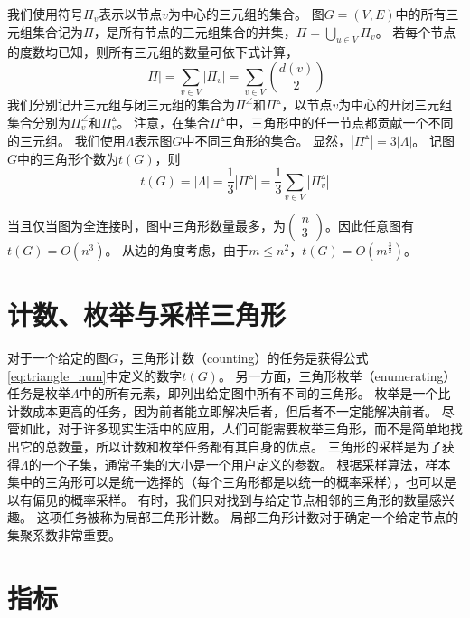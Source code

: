 我们使用符号$\Pi_v$表示以节点$v$为中心的三元组的集合。
图$G=(V,E)$中的所有三元组集合记为$\Pi$，是所有节点的三元组集合的并集，$\Pi=\bigcup_{u\in V}\Pi_v$。
若每个节点的度数均已知，则所有三元组的数量可依下式计算，
\begin{equation}
    |\Pi|=\sum_{v\in V}|\Pi_v|=\sum_{v\in V}\binom{d(v)}{2} 
    \label{eq:triple_num}
\end{equation}
我们分别记开三元组与闭三元组的集合为$\Pi^\angle $和$\Pi^\vartriangle $，以节点$v$为中心的开闭三元组集合分别为$\Pi^\angle_v$和$\Pi^\vartriangle_v$。
注意，在集合$\Pi^\vartriangle $中，三角形中的任一节点都贡献一个不同的三元组。
我们使用$\Lambda$表示图$G$中不同三角形的集合。
显然，$|\Pi^\vartriangle|=3|\Lambda|$。
记图$G$中的三角形个数为$t(G)$，则
\begin{equation}
    t(G)=|\Lambda|=\frac{1}{3}|\Pi^\vartriangle|=\frac{1}{3}\sum_{v\in V}|\Pi^\vartriangle_v|
    \label{eq:triangle_num}
\end{equation}

当且仅当图为全连接时，图中三角形数量最多，为$\left(\begin{array}{l}n \\3\end{array}\right)$。因此任意图有$t(G)=O(n^{3})$。
从边的角度考虑，由于$m\le n^{2}$，$t(G)=O(m^{\frac{3}{2}})$。

\section{计数、枚举与采样三角形}

对于一个给定的图$G$，三角形计数（counting）的任务是获得公式\ref{eq:triangle_num}中定义的数字$t(G)$。
另一方面，三角形枚举（enumerating）任务是枚举$\Lambda$中的所有元素，即列出给定图中所有不同的三角形。
枚举是一个比计数成本更高的任务，因为前者能立即解决后者，但后者不一定能解决前者。
尽管如此，对于许多现实生活中的应用，人们可能需要枚举三角形，而不是简单地找出它的总数量，所以计数和枚举任务都有其自身的优点。
三角形的采样是为了获得$\Lambda$的一个子集，通常子集的大小是一个用户定义的参数。
根据采样算法，样本集中的三角形可以是统一选择的（每个三角形都是以统一的概率采样），也可以是以有偏见的概率采样。
有时，我们只对找到与给定节点相邻的三角形的数量感兴趣。
这项任务被称为局部三角形计数。
局部三角形计数对于确定一个给定节点的集聚系数非常重要。

\section{指标}

